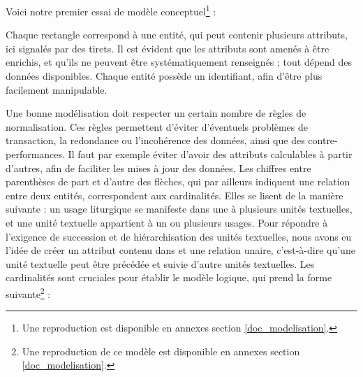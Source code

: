 \documentclass[a4paper,12pt,twoside]{book}
\begin{document}
	Voici notre premier essai de modèle conceptuel\footnote{Une reproduction est disponible en annexes section \ref{doc_modelisation}.} : 
	
	
	Chaque rectangle correspond à une entité, qui peut contenir plusieurs attributs, ici signalés par des tirets. Il est évident que les attributs sont amenés à être enrichis, et qu'ils ne peuvent être systématiquement renseignés ; tout dépend des données disponibles. Chaque entité possède un identifiant, afin d'être plus facilement manipulable. 
	
	Une bonne modélisation doit respecter un certain nombre de règles de normalisation. Ces règles permettent d'éviter d'éventuels problèmes de transaction, la redondance ou l'incohérence des données, ainsi que des contre-performances. Il faut par exemple éviter d'avoir des attributs calculables à partir d'autres, afin de faciliter les mises à jour des données. Les chiffres entre parenthèses de part et d'autre des flèches, qui par ailleurs indiquent une relation entre deux entités, correspondent aux cardinalités. Elles se lisent de la manière suivante : un usage liturgique se manifeste dans une à plusieurs unités textuelles, et une unité textuelle appartient à un ou plusieurs usages. Pour répondre à l'exigence de succession et de hiérarchisation des unités textuelles, nous avons eu l'idée de créer un attribut \og contenu dans\fg{} et une relation unaire, c'est-à-dire qu'une unité textuelle peut être précédée et suivie d'autre unités textuelles. Les cardinalités sont cruciales pour établir le modèle logique, qui prend la forme suivante\footnote{Une reproduction de ce modèle est disponible en annexes section \ref{doc_modelisation}.} : 
\end{document}
